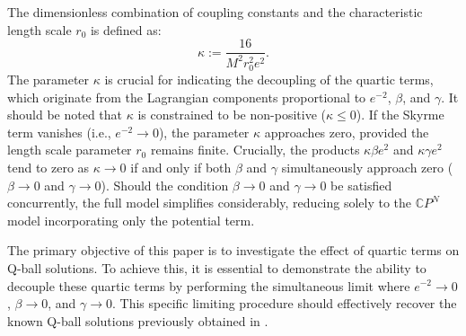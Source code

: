 \documentclass[aps,prd,superscriptaddress,notitlepage,11pt,final,longbibliography,nofootinbib]{revtex4-1}
\newcommand{\be}{\begin{equation}}
\newcommand{\ee}{\end{equation}}
\numberwithin{equation}{section}
\begin{document}
The dimensionless combination of coupling constants and the characteristic length scale $r_0$ is defined as:
\be
\kappa:=\frac{16}{M^2 r_0^2e^2}.
\ee
The parameter $\kappa$ is crucial for indicating the decoupling of the quartic terms, which originate from the Lagrangian components proportional to $e^{-2}$, $\beta$, and $\gamma$. It should be noted that $\kappa$ is constrained to be non-positive ($\kappa\le 0$). If the Skyrme term vanishes (i.e., $e^{-2}\to 0$), the parameter $\kappa$ approaches zero, provided the length scale parameter $r_0$ remains finite. Crucially, the products $\kappa \beta e^2$ and $\kappa \gamma e^2$ tend to zero as $\kappa\to 0$ if and only if both $\beta$ and $\gamma$ simultaneously approach zero ($\beta\to 0$ and $\gamma\to 0$). Should the condition $\beta\to 0$ and $\gamma\to 0$ be satisfied concurrently, the full model simplifies considerably, reducing solely to the $\mathbb{C}P^N$ model incorporating only the potential term.



The primary objective of this paper is to investigate the effect of quartic terms on Q-ball solutions. To achieve this, it is essential to demonstrate the ability to decouple these quartic terms by performing the simultaneous limit where $e^{-2}\rightarrow 0$, $\beta\rightarrow 0$, and $\gamma\rightarrow 0$. This specific limiting procedure should effectively recover the known Q-ball solutions previously obtained in \cite{Klimas:2017eft}.
\end{document}
